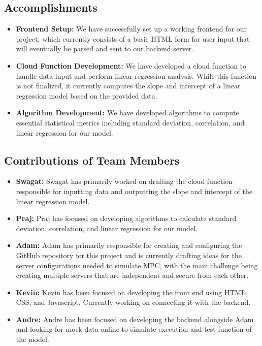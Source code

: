 \documentclass[conference]{IEEEtran}
\begin{document}
\subsection*{Accomplishments}

\begin{itemize}
    \item \textbf{Frontend Setup:} We have successfully set up a working frontend for our project, which currently consists of a basic HTML form for user input that will eventually be parsed and sent to our backend server. 
    
    \item \textbf{Cloud Function Development:} We have developed a cloud function to handle data input and perform linear regression analysis. While this function is not finalized, it currently computes the slope and intercept of a linear regression model based on the provided data. 
    
    \item \textbf{Algorithm Development:} We have developed algorithms to compute essential statistical metrics including standard deviation, correlation, and linear regression for our model.~\cite{MPC1}
\end{itemize}

\subsection*{Contributions of Team Members}

\begin{itemize}
    \item \textbf{Swagat:} Swagat has primarily worked on drafting the cloud function responsible for inputting data and outputting the slope and intercept of the linear regression model.
    
    \item \textbf{Praj:} Praj has focused on developing algorithms to calculate standard deviation, correlation, and linear regression for our model.

    \item \textbf{Adam:} Adam has primarily responsible for creating and configuring the GitHub repository for this project and is currently drafting ideas for the server configurations needed to simulate MPC, with the main challenge being creating multiple servers that are independent and secure from each other. 
    
    \item \textbf{Kevin:} Kevin has been focused on developing the front end using HTML, CSS, and Javascript. Currently working on connecting it with the backend. 

    \item \textbf{Andre:} Andre has been focused on developing the backend alongside Adam and looking for mock data online to simulate execution and test function of the model. 
\end{itemize}
\end{document}
